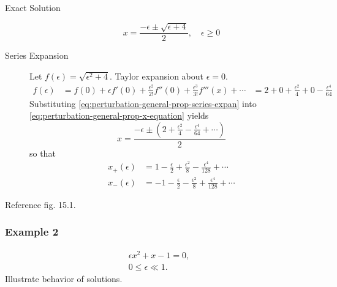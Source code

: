 \documentclass[12pt,twoside]{article}
\begin{document}
\begin{description}
\item[Exact Solution]
\begin{equation}
  \label{eq:perturbation-general-prop-x-equation}
  x = \frac{-\epsilon\pm\sqrt{\epsilon+4}}{2},\quad \epsilon\ge0
\end{equation}
\item[Series Expansion] Let $f(\epsilon)=\sqrt{\epsilon^2+4}$. Taylor
  expansion about $\epsilon=0$.
  \begin{equation}
    \label{eq:perturbation-general-prop-series-expan}
    \begin{aligned}
      f(\epsilon) &= f(0)+\epsilon f'(0) + \frac{\epsilon^2}{2!}f''(0) +
      \frac{\epsilon^3}{3!}f'''(x)+\cdots
      &= 2 + 0 + \frac{\epsilon^2}{4}+0-\frac{\epsilon^4}{64}
    \end{aligned}
  \end{equation}
  Substituting \cref{eq:perturbation-general-prop-series-expan} into
  \cref{eq:perturbation-general-prop-x-equation} yields
  \begin{equation*}
    \label{eq:perturbation-general-prop-taylor-x}
    x = \frac{-\epsilon\pm(2+\frac{\epsilon^2}{4}-\frac{\epsilon^4}{64}+\cdots)}{2}
  \end{equation*}
  so that
  \begin{equation}
    \label{eq:perturbation-general-prop-taylor-x-pm}
    \begin{aligned}
      x_+(\epsilon)&=1-\frac{\epsilon}{2} + \frac{\epsilon^2}{8} -
      \frac{\epsilon^4}{128}+\cdots \\
      x_-(\epsilon)&=-1-\frac{\epsilon}{2} - \frac{\epsilon^2}{8} +
      \frac{\epsilon^4}{128}+\cdots
    \end{aligned}\end{equation}
\end{description}
Reference fig. 15.1.

\subsubsection{Example 2}
\begin{equation*}
  \begin{aligned}
    \epsilon x^2+ x-1=0,\\
    0\le\epsilon\ll1.
  \end{aligned}
\end{equation*}
Illustrate behavior of solutions.
\end{document}
